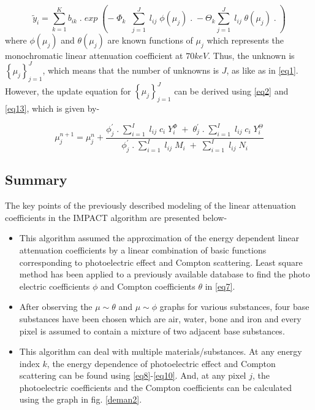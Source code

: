 \begin{equation}
\label{eq13}
\widetilde{y}_{i} = \sum\limits_{k=1}^K  b_{ik} \; . \; exp \; \left(- \; \Phi_{k} \;  \; \sum\limits_{j=1}^J \; l_{ij} \; \phi(\mu_j) \; . \; -  \Theta_{k} \sum\limits_{j=1}^J \; l_{ij} \; \theta(\mu_j) \; . \; \right)
\end{equation} where $\phi(\mu_j)$ and $\theta(\mu_j)$ are known functions of $\mu_j$ which represents the monochromatic linear attenuation coefficient at $70keV$. Thus, the unknown is $\left \{\mu_{j} \right \}_{j=1}^{J}$, which means that the number of unknowns is $J$, as like as in \ref{eq1}. However, the update equation for $\left \{\mu_{j} \right \}_{j=1}^{J}$ can be derived using \ref{eq2} and \ref{eq13}, which is given by-

\begin{equation}
\label{eq14}
\mu_{j}^{n+1} = \mu_{j}^{n} + \frac{\phi_{j}^{'} \; . \; \sum\limits_{i=1}^I \; l_{ij} \; c_i \; Y_{i}^{\Phi} \; + \; \theta_{j}^{'} \; . \; \sum\limits_{i=1}^I \; l_{ij} \; c_i \; Y_{i}^{\Theta} }{\phi_{j}^{'} \; . \; \sum\limits_{i=1}^I \; l_{ij} \; M_i \; +  \;  \sum\limits_{i=1}^I \; l_{ij} \; N_i}
\end{equation}

\subsection{Summary}

The key points of the previously described modeling of the linear attenuation coefficients in the IMPACT algorithm are presented below-

\begin{itemize}

  \item This algorithm assumed the approximation of the energy dependent linear attenuation coefficients by a linear combination of basic functions corresponding to photoelectric effect and Compton scattering. Least square method has been applied to a previously available database to find the photo electric coefficients $\phi$ and Compton coefficients $\theta$ in \ref{eq7}.
  
  \item After observing the $\mu\sim\theta$ and $\mu\sim\phi$ graphs for various substances, four base substances have been chosen which are air, water, bone and iron and every pixel is assumed to contain a mixture of two adjacent base substances.
  
  \item This algorithm can deal with multiple materials/substances. At any energy index $k$, the energy dependence of photoelectric effect and Compton scattering can be found using \ref{eq8}-\ref{eq10}. And, at any pixel $j$, the photoelectric coefficients and the Compton coefficients can be calculated using the graph in fig. \ref{deman2}.
   
\end{itemize}

